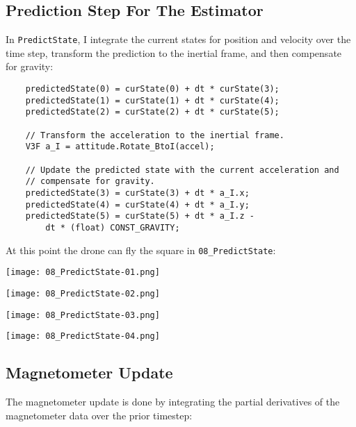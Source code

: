 \documentclass{article}
\begin{document}
\newpage
\subsection{Prediction Step For The Estimator}

In \texttt{PredictState}, I integrate the current states for position
and velocity over the time step, transform the prediction to the
inertial frame, and then compensate for gravity:

\begin{verbatim}
    predictedState(0) = curState(0) + dt * curState(3);
    predictedState(1) = curState(1) + dt * curState(4);
    predictedState(2) = curState(2) + dt * curState(5);

    // Transform the acceleration to the inertial frame.
    V3F a_I = attitude.Rotate_BtoI(accel);

    // Update the predicted state with the current acceleration and
    // compensate for gravity.
    predictedState(3) = curState(3) + dt * a_I.x;
    predictedState(4) = curState(4) + dt * a_I.y;
    predictedState(5) = curState(5) + dt * a_I.z -
        dt * (float) CONST_GRAVITY;
\end{verbatim}

At this point the drone can fly the square in
\texttt{08\_PredictState}:

\begin{center}
    \texttt{[image: 08\_PredictState-01.png]}
\end{center}

\begin{center}
    \texttt{[image: 08\_PredictState-02.png]}
\end{center}

\begin{center}
    \texttt{[image: 08\_PredictState-03.png]}
\end{center}

\begin{center}
    \texttt{[image: 08\_PredictState-04.png]}
\end{center}

\newpage
\subsection{Magnetometer Update}

The magnetometer update is done by integrating the partial derivatives
of the magnetometer data over the prior timestep:
\end{document}
